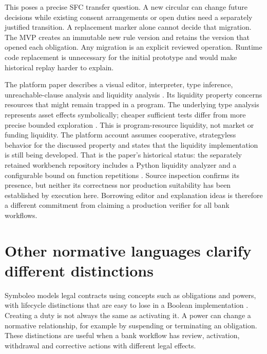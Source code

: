 \documentclass[12pt,a4paper,oneside,openany]{book}
\begin{document}
This poses a precise SFC transfer question. A new circular can change future
decisions while existing consent arrangements or open duties need a separately
justified transition. A replacement marker alone cannot decide that migration.
The MVP creates an immutable new rule version and retains the version that
opened each obligation. Any migration is an explicit reviewed operation.
Runtime code replacement is unnecessary for the initial prototype and would make
historical replay harder to explain.

The platform paper describes a visual editor, interpreter, type inference,
unreachable-clause analysis and liquidity analysis
\citep[secs.~3--7]{stipulaplatform2026}. Its liquidity property concerns resources
that might remain trapped in a program. The underlying type analysis represents
asset effects symbolically; cheaper sufficient tests differ from more precise
bounded exploration \citep[secs.~4--5 and proof appendices]{liquidity2023}.
This is program-resource liquidity, not market or funding liquidity. The platform
account assumes cooperative, strategyless behavior for the discussed property
and states that the liquidity implementation is still being developed.
That is the paper's historical status: the separately retained workbench
repository includes a Python liquidity analyzer and a configurable bound
on function repetitions \citep{stipulacode}. Source inspection confirms
its presence, but neither its correctness nor production suitability has
been established by execution here. Borrowing
editor and explanation ideas is therefore a different commitment from claiming
a production verifier for all bank workflows.

\section{Other normative languages clarify different distinctions}
\label{merge:M04:08}

\label{sec:languages-other}
Symboleo models legal contracts using concepts such as obligations and powers,
with lifecycle distinctions that are easy to lose in a Boolean implementation
\citep[secs.~II--IV]{symboleo2020}. Creating a duty is not always the same as
activating it. A power can change a normative relationship, for example by
suspending or terminating an obligation. These distinctions are useful when a
bank workflow has review, activation, withdrawal and corrective actions with
different legal effects.
\end{document}
